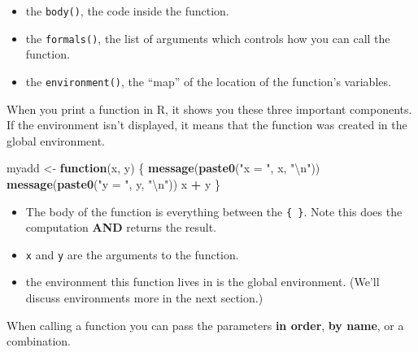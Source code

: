 \documentclass[]{book}
\newenvironment{Shaded}{\begin{snugshade}}{\end{snugshade}}
\newcommand{\KeywordTok}[1]{\textcolor[rgb]{0.13,0.29,0.53}{\textbf{#1}}}
\newcommand{\CharTok}[1]{\textcolor[rgb]{0.31,0.60,0.02}{#1}}
\newcommand{\StringTok}[1]{\textcolor[rgb]{0.31,0.60,0.02}{#1}}
\newcommand{\ControlFlowTok}[1]{\textcolor[rgb]{0.13,0.29,0.53}{\textbf{#1}}}
\newcommand{\OperatorTok}[1]{\textcolor[rgb]{0.81,0.36,0.00}{\textbf{#1}}}
\newcommand{\NormalTok}[1]{#1}
\providecommand{\tightlist}{%
  \setlength{\itemsep}{0pt}\setlength{\parskip}{0pt}}
\begin{document}
\begin{itemize}
\item
  the \texttt{body()}, the code inside the function.
\item
  the \texttt{formals()}, the list of arguments which controls how you
  can call the function.
\item
  the \texttt{environment()}, the ``map'' of the location of the
  function's variables.
\end{itemize}

When you print a function in R, it shows you these three important
components. If the environment isn't displayed, it means that the
function was created in the global environment.

\begin{Shaded}
\begin{Highlighting}[]
\NormalTok{myadd <-}\StringTok{ }\ControlFlowTok{function}\NormalTok{(x, y) \{}
  \KeywordTok{message}\NormalTok{(}\KeywordTok{paste0}\NormalTok{(}\StringTok{"x = "}\NormalTok{, x, }\StringTok{"}\CharTok{\textbackslash{}n}\StringTok{"}\NormalTok{))}
  \KeywordTok{message}\NormalTok{(}\KeywordTok{paste0}\NormalTok{(}\StringTok{"y = "}\NormalTok{, y, }\StringTok{"}\CharTok{\textbackslash{}n}\StringTok{"}\NormalTok{))}
\NormalTok{  x }\OperatorTok{+}\StringTok{ }\NormalTok{y}
\NormalTok{\}}
\end{Highlighting}
\end{Shaded}

\begin{itemize}
\tightlist
\item
  The body of the function is everything between the \texttt{\{\ \}}.
  Note this does the computation \textbf{AND} returns the result.
\item
  \texttt{x} and \texttt{y} are the arguments to the function.
\item
  the environment this function lives in is the global environment.
  (We'll discuss environments more in the next section.)
\end{itemize}

When calling a function you can pass the parameters \textbf{in order},
\textbf{by name}, or a combination.
\end{document}
